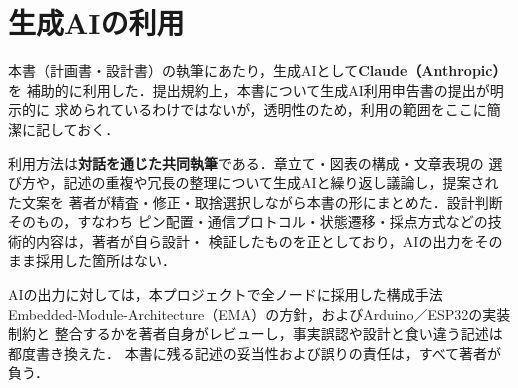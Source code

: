 \documentclass[lualatex,book,paper=a4paper,jafontsize=11.5pt,jafontscale=1.05]{jlreq}
\begin{document}
\chapter{生成AIの利用}\label{chap:genai}

本書（計画書・設計書）の執筆にあたり，生成AIとして\textbf{Claude（Anthropic）}を
補助的に利用した．提出規約上，本書について生成AI利用申告書の提出が明示的に
求められているわけではないが，透明性のため，利用の範囲をここに簡潔に記しておく．

利用方法は\textbf{対話を通じた共同執筆}である．章立て・図表の構成・文章表現の
選び方や，記述の重複や冗長の整理について生成AIと繰り返し議論し，提案された文案を
著者が精査・修正・取捨選択しながら本書の形にまとめた．設計判断そのもの，すなわち
ピン配置・通信プロトコル・状態遷移・採点方式などの技術的内容は，著者が自ら設計・
検証したものを正としており，AIの出力をそのまま採用した箇所はない．

AIの出力に対しては，本プロジェクトで全ノードに採用した構成手法
Embedded-Module-Architecture（EMA）の方針，およびArduino／ESP32の実装制約と
整合するかを著者自身がレビューし，事実誤認や設計と食い違う記述は都度書き換えた．
本書に残る記述の妥当性および誤りの責任は，すべて著者が負う．
\end{document}
